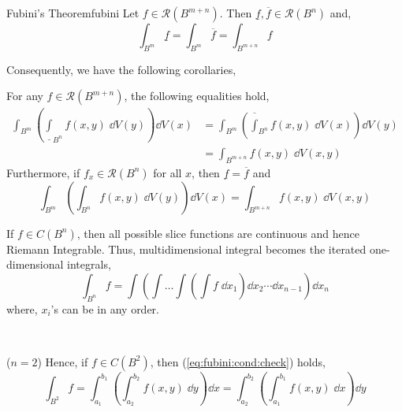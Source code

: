 \documentclass[../Analysis-3.tex]{subfiles}
\begin{document}
\begin{Thm}{Fubini's Theorem}{fubini}
  Let $ f \in \mathscr{R}(B^{m+n}) $. Then $ \underline{f}, \overline{f} \in \mathscr{R}(B^n) $ and,
  \[  \int_{B^m} \underline{f} = \int_{B^m} \overline{f} = \int_{B^{m+n}} f \]
\end{Thm}

Consequently, we have the following corollaries,

\begin{Cor}{}{}
  For any $f \in \mathscr{R}(B^{m+n}) $, the following equalities hold,
  \begin{align*}
    \int_{B^m} \left( \underline{\int}_{B^n} f(x,y) \; \dd{V(y)} \right)\dd{V(x)}
     & = \int_{B^m} \left( \overline{\int}_{B^n} f(x,y) \; \dd{V(x)} \right) \dd{V(y)} \\
     & = \int_{B^{m+n}} f(x,y) \; \dd{V(x,y)}
  \end{align*}
  Furthermore, if $ f_x \in \mathscr{R}(B^n) $ for all $ x $, then $ \underline{f} = \overline{f} $ and
  \[  \int_{B^m} \left( \int_{B^n} f(x,y) \; \dd{V(y)} \right) \dd{V(x)} = \int_{B^{m+n}} f(x,y) \; \dd{V(x,y)}  \]
\end{Cor}

\begin{Cor}{}{}
  If $ f \in C(B^n) $, then all possible slice functions are continuous and hence Riemann Integrable. Thus, multidimensional integral becomes the iterated one-dimensional integrals,
  \[  \int_{B^n} f = \int \left( \int \dots \int \left( \int f \; \dd{x_1} \right) \dd{x_2} \cdots \dd{x_{n-1}} \right) \dd{x_n}  \]
  where, $x_i$'s can be in any order.

  \

  ($n=2$) Hence, if $ f \in C(B^2) $, then (\ref{eq:fubini:cond:check}) holds,
  \[ \int_{B^2} f = \int_{a_1}^{b_1} \left( \int_{a_2}^{b_2} f(x,y) \; \dd y \right)\dd x = \int_{a_2}^{b_2}\left( \int_{a_1}^{b_1}  f(x,y) \; \dd x \right)\dd y \]
\end{Cor}
\end{document}
